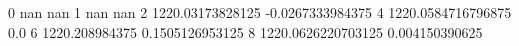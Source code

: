 0 nan nan
1 nan nan
2 1220.03173828125 -0.0267333984375
4 1220.0584716796875 0.0
6 1220.208984375 0.1505126953125
8 1220.0626220703125 0.004150390625
